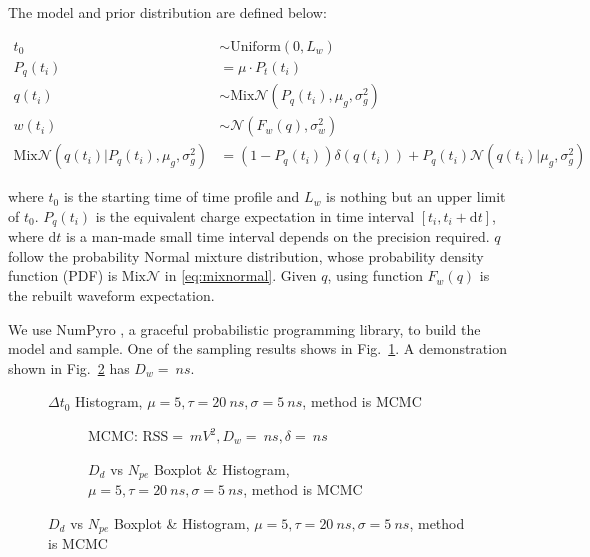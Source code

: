 The model and prior distribution are defined below: 

\begin{align}
    t_{0} &\sim \mathrm{Uniform}(0, L_{w}) \\
    P_{q}(t_{i}) &= \mu \cdot P_{t}(t_{i}) \\
    q(t_{i}) &\sim \mathrm{Mix}\mathcal{N}(P_{q}(t_{i}), \mu_{g}, \sigma_{g}^{2}) \\
    w(t_{i}) &\sim \mathcal{N}(F_{w}(q), \sigma_{w}^{2}) \\
    \mathrm{Mix}\mathcal{N}(q(t_{i}) | P_{q}(t_{i}), \mu_{g}, \sigma_{g}^{2}) &= (1 - P_{q}(t_{i}))\delta(q(t_{i})) + P_{q}(t_{i})\mathcal{N}(q(t_{i}) | \mu_{g}, \sigma_{g}^{2}) \label{eq:mixnormal}
\end{align}

where $t_{0}$ is the starting time of time profile and $L_{w}$ is nothing but an upper limit of $t_{0}$. $P_{q}(t_{i})$ is the equivalent charge expectation in time interval $[t_{i}, t_{i}+\mathrm{d}t]$, where $\mathrm{d}t$ is a man-made small time interval depends on the precision required. $q$ follow the probability Normal mixture distribution, whose probability density function (PDF) is $\mathrm{Mix}\mathcal{N}$ in \eqref{eq:mixnormal}. Given $q$, using function $F_{w}(q)$ is the rebuilt waveform expectation. 

We use NumPyro \cite{phan2019composable}, a graceful probabilistic programming library, to build the model and sample. One of the sampling results shows in Fig.~\ref{fig:mcmc-t0hist}. A demonstration shown in Fig.~\ref{fig:mcmc} has $D_w = \SI{}{ns}$. 

\begin{figure}[H]
    \centering
    \resizebox{0.5\textwidth}{!}{}
    \caption{\label{fig:mcmc-t0hist} $\Delta t_{0}$ Histogram, $\mu=5, \tau=\SI{20}{ns}, \sigma=\SI{5}{ns}$, method is MCMC}
\end{figure}

\begin{figure}[H]
  \begin{subfigure}{.5\textwidth}
    \centering
    \resizebox{\textwidth}{!}{}
    \caption{\label{fig:mcmc}MCMC: $\mathrm{RSS}=\SI{}{mV^2},D_w=\SI{}{ns},\delta=\SI{}{ns}$}
  \end{subfigure}
  \begin{subfigure}{.5\textwidth}
    \centering
    \resizebox{\textwidth}{!}{}
    \caption{\label{fig:mcmc-npe} $D_d$ vs $N_{pe}$ Boxplot \& Histogram, $\mu=5, \tau=\SI{20}{ns}, \sigma=\SI{5}{ns}$, method is MCMC}
  \end{subfigure}
\end{figure}

